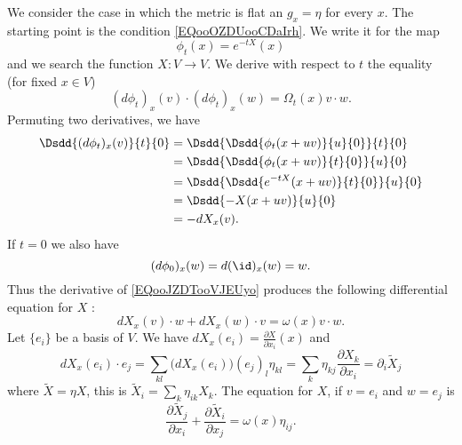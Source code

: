 We consider the case in which the metric is flat an \( g_x=\eta\) for every \( x\).  The starting point is the condition \eqref{EQooOZDUooCDaIrh}. We write it for the map
\begin{equation}
    \phi_t(x)= e^{-tX}(x)
\end{equation}
and we search the function \( X\colon V\to V\). We derive with respect to \( t\) the equality (for fixed \( x\in V\))
\begin{equation}        \label{EQooJZDTooVJEUyo}
    (d\phi_t)_x(v)\cdot (d\phi_t)_x(w)=\Omega_t(x)v\cdot w.
\end{equation}
Permuting two derivatives, we have
\begin{subequations}
    \begin{align}
        \Dsdd{ (d\phi_t)_x(v) }{t}{0}&=\Dsdd{ \Dsdd{   \phi_t(x+uv)  }{u}{0} }{t}{0}\\
        &=\Dsdd{\Dsdd{ \phi_t(x+uv) }{t}{0} }{u}{0}\\
        &=\Dsdd{ \Dsdd{  e^{-tX}(x+uv) }{t}{0} }{u}{0}\\
        &=\Dsdd{ -X(x+uv) }{u}{0}\\
        &=-dX_x(v).
    \end{align}
\end{subequations}
If \( t=0\) we also have
\begin{equation}
    (d\phi_0)_x(w)=d(\id)_x(w)=w.
\end{equation}
Thus the derivative of \eqref{EQooJZDTooVJEUyo} produces the following differential equation for \( X\) :
\begin{equation}
    dX_x(v)\cdot w+dX_x(w)\cdot v=\omega(x)v\cdot w.
\end{equation}
Let \( \{ e_i \}\) be a basis of \( V\). We have \( dX_x(e_i)=\frac{ \partial X }{ \partial x_i }(x)\) and
\begin{equation}
    dX_x(e_i)\cdot e_j=\sum_{kl}\big( dX_x(e_i) \big)(e_j)_l\eta_{kl}=\sum_k\eta_{kj}\frac{ \partial X_k }{ \partial x_i }=\partial_i\tilde X_j
\end{equation}
where \( \tilde X=\eta X\), this is \( \tilde X_i=\sum_k\eta_{ik}X_k\). The equation for \( X\), if \( v=e_i\) and \( w=e_j\) is
\begin{equation}        \label{EQooAKZWooOVIdur}
    \frac{ \partial \tilde X_j }{ \partial x_i }+\frac{ \partial \tilde X_i }{ \partial x_j }=\omega(x)\eta_{ij}.
\end{equation}

